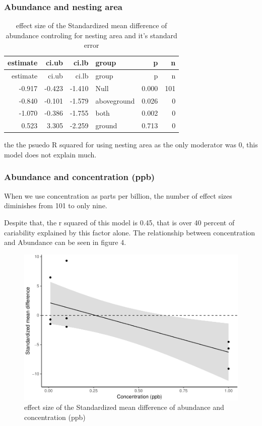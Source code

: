 \documentclass[]{elsarticle} %
\makeatletter
\def\maxwidth{\ifdim\Gin@nat@width>\linewidth\linewidth
\else\Gin@nat@width\fi}
\let\Oldincludegraphics\includegraphics
\renewcommand{\includegraphics}[1]{\Oldincludegraphics[width=\maxwidth]{#1}}
\makeatother
\begin{document}
\subsubsection{Abundance and nesting
area}\label{abundance-and-nesting-area}

\begin{longtable}[c]{@{}rrrlrr@{}}
\caption{effect size of the Standardized mean difference of abundance
controling for nesting area and it's standard error}\tabularnewline
\toprule
estimate & ci.ub & ci.lb & group & p & n\tabularnewline
\midrule
\endfirsthead
\toprule
estimate & ci.ub & ci.lb & group & p & n\tabularnewline
\midrule
\endhead
-0.917 & -0.423 & -1.410 & Null & 0.000 & 101\tabularnewline
-0.840 & -0.101 & -1.579 & aboveground & 0.026 & 0\tabularnewline
-1.070 & -0.386 & -1.755 & both & 0.002 & 0\tabularnewline
0.523 & 3.305 & -2.259 & ground & 0.713 & 0\tabularnewline
\bottomrule
\end{longtable}

the the psuedo R squared for using nesting area as the only moderator
was 0, this model does not explain much.

\subsubsection{Abundance and concentration
(ppb)}\label{abundance-and-concentration-ppb}

When we use concentration as parts per billion, the number of effect
sizes diminishes from 101 to only nine.

Despite that, the r squared of this model is 0.45, that is over 40
percent of cariability explained by this factor alone. The relationship
between concentration and Abundance can be seen in figure 4.

\begin{figure}[htbp]
\centering
\includegraphics{MetanalysisNeonics_files/figure-latex/unnamed-chunk-9-1.pdf}
\caption{effect size of the Standardized mean difference of abundance
and concentration (ppb)}
\end{figure}
\end{document}
